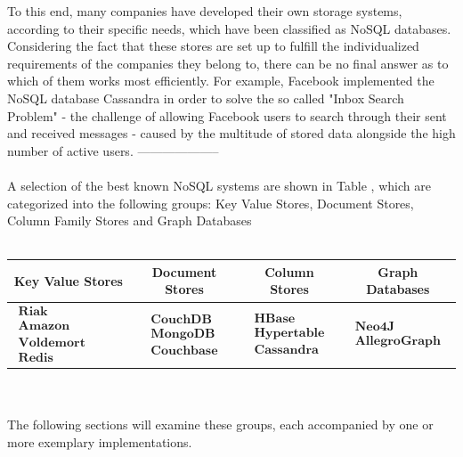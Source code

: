 To this end, many companies have developed their own storage systems, according to their specific needs, which have been classified as NoSQL databases. Considering the fact that these stores are set up to fulfill the individualized requirements of the companies they belong to, there can be no final answer as to which of them  works most efficiently. For example, Facebook implemented the NoSQL database Cassandra in order to solve the so called "Inbox Search Problem" - the challenge of allowing Facebook users to search through their sent and received messages - caused by the multitude of stored data alongside the high number of active users. 
--------------------
\\
\\
A selection of the best known NoSQL systems are shown in Table , which are categorized into the following groups: Key Value Stores, Document Stores, Column Family Stores and  Graph Databases
\\
\\
\begin{tabular}{|c|c|c|c|}
\hline 
\textbf{Key Value Stores} & \textbf{Document Stores} & \textbf{Column Stores} & \textbf{Graph Databases} \\ 
\hline 
$\begin{array}{l} \textbf{Riak} \\ \textbf{Amazon SimpleDB} \\ \textbf{Voldemort}\\  \textbf{Redis} \end{array}$ & 
$\begin{array}{l} \textbf{CouchDB} \\ \textbf{MongoDB} \\ \textbf{Couchbase} \end{array}$ & 
$\begin{array}{l} \textbf{HBase} \\ \textbf{Hypertable} \\ \textbf{Cassandra}  \end{array}$  & 
$\begin{array}{l} \textbf{Neo4J} \\ \textbf{AllegroGraph}   \end{array}$ \\ 
\hline 
\end{tabular}
\\
\\

The following sections will examine these groups, each accompanied by one or more exemplary implementations.      

